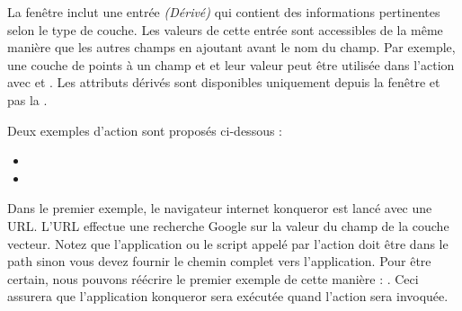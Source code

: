 La fenêtre  inclut une entrée {\em (Dérivé)} qui contient des informations pertinentes selon le type de couche. Les valeurs de cette entrée sont accessibles de la même manière que les autres champs en ajoutant  avant le nom du champ. Par exemple, une couche de points à un champ  et  et leur valeur peut être utilisée dans l'action avec  et . Les attributs dérivés sont disponibles uniquement depuis la fenêtre  et pas la .

Deux exemples d'action sont proposés ci-dessous : 

\begin{itemize}
  \item {}
  \item {}
\end{itemize}

Dans le premier exemple, le navigateur internet konqueror est lancé avec une URL. L'URL effectue une recherche Google sur la valeur du champ  de la couche vecteur. Notez que l'application ou le script appelé par l'action doit être dans le path sinon vous devez fournir le chemin complet vers l'application. Pour être certain, nous pouvons réécrire le premier exemple de cette manière : . Ceci assurera que l'application konqueror sera exécutée quand l'action sera invoquée.


